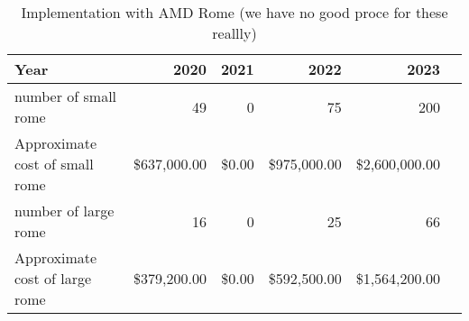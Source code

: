 \tiny \begin{longtable} { |p{}  |r  |r  |r  |r  |r |} 
\caption{Implementation with AMD Rome (we have no good proce for these reallly) \label{tab:Rome}}\\ 
\hline 
\textbf{Year}&\textbf{2020}&\textbf{2021}&\textbf{2022}&\textbf{2023} \\ \hline
{number of small rome }&{49}&{0}&{75}&{200} \\ \hline
{Approximate cost of small rome }&{\$637,000.00}&{\$0.00}&{\$975,000.00}&{\$2,600,000.00} \\ \hline
{number of large rome }&{16}&{0}&{25}&{66} \\ \hline
{Approximate cost of large rome }&{\$379,200.00}&{\$0.00}&{\$592,500.00}&{\$1,564,200.00} \\ \hline
\end{longtable} \normalsize
